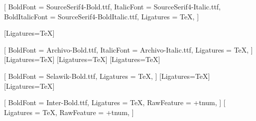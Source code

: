 
\RequirePackage{fontspec}

\setmainfont{SourceSerif4-Regular.ttf}[
  BoldFont       = SourceSerif4-Bold.ttf,
  ItalicFont     = SourceSerif4-Italic.ttf,
  BoldItalicFont = SourceSerif4-BoldItalic.ttf,
  Ligatures      = TeX,
]

[Ligatures=TeX]

[
  BoldFont   = Archivo-Bold.ttf,
  ItalicFont = Archivo-Italic.ttf,
  Ligatures  = TeX,
]
[Ligatures=TeX]
[Ligatures=TeX]
[Ligatures=TeX]

[
  BoldFont  = Selawik-Bold.ttf,
  Ligatures = TeX,
]
[Ligatures=TeX]
[Ligatures=TeX]

[
  BoldFont   = Inter-Bold.ttf,
  Ligatures  = TeX,
  RawFeature = {+tnum},
]
[
  Ligatures  = TeX,
  RawFeature = {+tnum},
]
